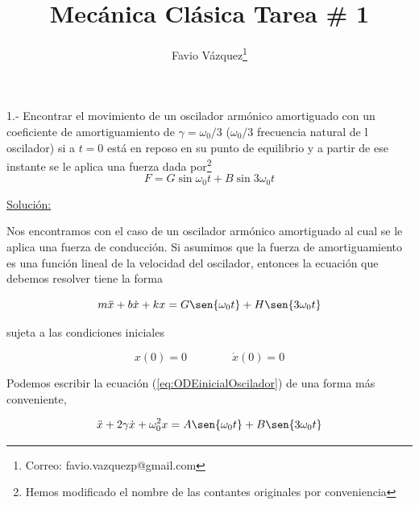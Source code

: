 \documentclass[a4paper,10pt]{article}
\title{Mecánica Clásica Tarea \# 1}
\author{Favio Vázquez\thanks{Correo: favio.vazquezp@gmail.com}}\affil{Instituto de Física. Universidad Nacional Autónoma de México}
\date{}
\begin{document}
\makeatletter
\def\@maketitle{%
  \newpage
  \null
  \vskip 2em%
  \begin{center}%
  \let \footnote \thanks
    {\Large\bfseries \@title \par}%
    \vskip 1.5em%
    {\normalsize
      \lineskip .5em%
      \begin{tabular}[t]{c}%
        \@author
      \end{tabular}\par}%
    \vskip 1em%
    {\normalsize \@date}%
  \end{center}%
  \par
  \vskip 1.5em}
\makeatother

\maketitle

1.- Encontrar el movimiento de un oscilador armónico amortiguado
con un coeficiente de amortiguamiento de $\gamma = \omega_{0}/3$ 
($\omega_{0}/3$ frecuencia natural de l oscilador) si a $t=0$ está 
en reposo en su punto de equilibrio y a partir de ese instante se le
aplica una fuerza dada por\footnote{Hemos modificado el nombre de las contantes originales por conveniencia} 
$$F= G\sin{\omega_{0}t}+B\sin{3\omega_{0}t}$$

\underline{Solución:}

\vspace{.3cm}

Nos encontramos con el caso de un oscilador armónico amortiguado al cual se le
aplica una fuerza de conducción. Si asumimos que la fuerza de amortiguamiento es
una función lineal de la velocidad del oscilador, entonces la ecuación que debemos
resolver tiene la forma

\begin{equation}
 m\ddot{x} + b \dot{x} + kx = G \sen{\omega_0 t} + H \sen{3\omega_0 t}
 \label{eq:ODEinicialOscilador}
\end{equation}

sujeta a las condiciones iniciales

\begin{equation}
 x(0) = 0 \qquad \qquad \dot{x}(0) = 0
 \label{eq:condInicialesOscilador}
\end{equation}

Podemos escribir la ecuación (\ref{eq:ODEinicialOscilador}) de una forma más conveniente,

\begin{equation}
 \ddot{x} + 2\gamma \dot{x} + \omega_0^2 x = A \sen{\omega_0 t} + B \sen{3\omega_0 t}
 \label{eq:ODEmejoradaOscilador}
\end{equation}
\end{document}
